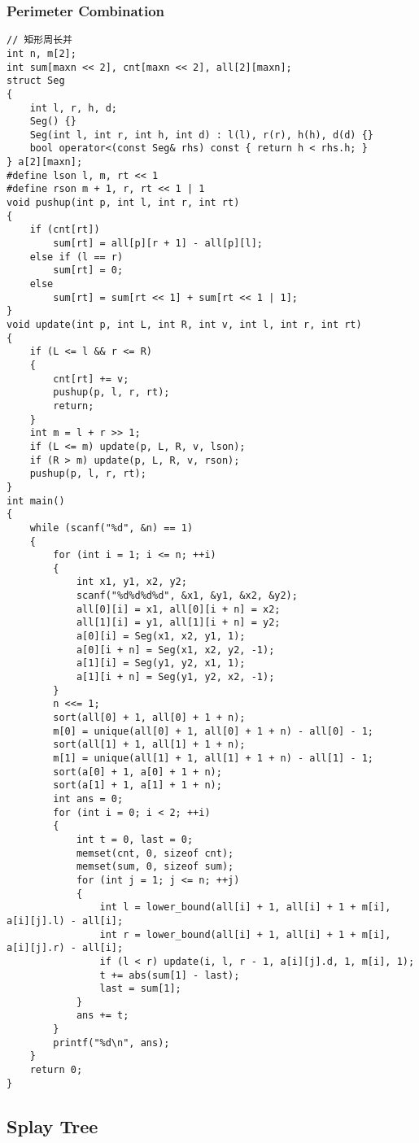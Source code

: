 \documentclass[twoside]{article}
\begin{document}
\subsubsection{Perimeter Combination}
\begin{lstlisting}
// 矩形周长并
int n, m[2];
int sum[maxn << 2], cnt[maxn << 2], all[2][maxn];
struct Seg
{
    int l, r, h, d;
    Seg() {}
    Seg(int l, int r, int h, int d) : l(l), r(r), h(h), d(d) {}
    bool operator<(const Seg& rhs) const { return h < rhs.h; }
} a[2][maxn];
#define lson l, m, rt << 1
#define rson m + 1, r, rt << 1 | 1
void pushup(int p, int l, int r, int rt)
{
    if (cnt[rt])
        sum[rt] = all[p][r + 1] - all[p][l];
    else if (l == r)
        sum[rt] = 0;
    else
        sum[rt] = sum[rt << 1] + sum[rt << 1 | 1];
}
void update(int p, int L, int R, int v, int l, int r, int rt)
{
    if (L <= l && r <= R)
    {
        cnt[rt] += v;
        pushup(p, l, r, rt);
        return;
    }
    int m = l + r >> 1;
    if (L <= m) update(p, L, R, v, lson);
    if (R > m) update(p, L, R, v, rson);
    pushup(p, l, r, rt);
}
int main()
{
    while (scanf("%d", &n) == 1)
    {
        for (int i = 1; i <= n; ++i)
        {
            int x1, y1, x2, y2;
            scanf("%d%d%d%d", &x1, &y1, &x2, &y2);
            all[0][i] = x1, all[0][i + n] = x2;
            all[1][i] = y1, all[1][i + n] = y2;
            a[0][i] = Seg(x1, x2, y1, 1);
            a[0][i + n] = Seg(x1, x2, y2, -1);
            a[1][i] = Seg(y1, y2, x1, 1);
            a[1][i + n] = Seg(y1, y2, x2, -1);
        }
        n <<= 1;
        sort(all[0] + 1, all[0] + 1 + n);
        m[0] = unique(all[0] + 1, all[0] + 1 + n) - all[0] - 1;
        sort(all[1] + 1, all[1] + 1 + n);
        m[1] = unique(all[1] + 1, all[1] + 1 + n) - all[1] - 1;
        sort(a[0] + 1, a[0] + 1 + n);
        sort(a[1] + 1, a[1] + 1 + n);
        int ans = 0;
        for (int i = 0; i < 2; ++i)
        {
            int t = 0, last = 0;
            memset(cnt, 0, sizeof cnt);
            memset(sum, 0, sizeof sum);
            for (int j = 1; j <= n; ++j)
            {
                int l = lower_bound(all[i] + 1, all[i] + 1 + m[i], a[i][j].l) - all[i];
                int r = lower_bound(all[i] + 1, all[i] + 1 + m[i], a[i][j].r) - all[i];
                if (l < r) update(i, l, r - 1, a[i][j].d, 1, m[i], 1);
                t += abs(sum[1] - last);
                last = sum[1];
            }
            ans += t;
        }
        printf("%d\n", ans);
    }
    return 0;
}\end{lstlisting}
\subsection{Splay Tree}
\end{document}
